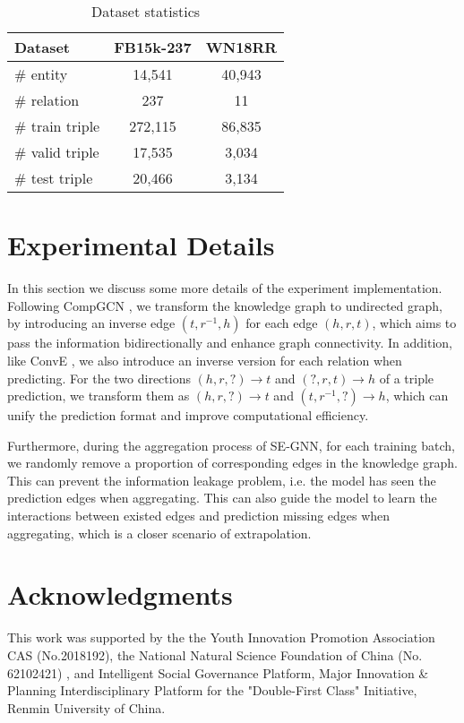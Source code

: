 \documentclass[letterpaper]{article} \usepackage{aaai22}  \usepackage{times}  \usepackage{helvet}  \usepackage{courier}  \usepackage[hyphens]{url}  \usepackage{graphicx} \urlstyle{rm} \def\UrlFont{\rm}  \usepackage{natbib}  \usepackage{caption} \DeclareCaptionStyle{ruled}{labelfont=normalfont,labelsep=colon,strut=off} \frenchspacing  \setlength{\pdfpagewidth}{8.5in}  \setlength{\pdfpageheight}{11in}  \usepackage{algorithm}
\begin{document}
\begin{table}[h]
    \centering
    \begin{tabular}{lcc}
      \toprule
      \textbf{Dataset} & \textbf{FB15k-237} & \textbf{WN18RR}\\
      \hline\hline
      \# entity          & 14,541     & 40,943  \\
      \# relation        & 237        & 11      \\ 
      \# train triple    & 272,115    & 86,835  \\
      \# valid triple    & 17,535     & 3,034   \\ 
      \# test triple     & 20,466     & 3,134   \\
      \bottomrule
    \end{tabular}
    \caption{Dataset statistics}
    \label{tab: dataset}
\end{table}

\section{Experimental Details}
\label{ap: experiment config}
In this section we discuss some more details of the experiment implementation. Following CompGCN \cite{ICLR_2020_Vashishth_CompGCN}, we transform the knowledge graph to undirected graph, by introducing an inverse edge $(t, r^{-1}, h)$ for each edge $(h, r, t)$, which aims to pass the information bidirectionally and enhance graph connectivity. In addition, like ConvE \cite{AAAI_2018_Dettmers_ConvE_WN18RR}, we also introduce an inverse version for each relation when predicting. For the two directions $(h, r, ?) \rightarrow t$ and $(?, r, t) \rightarrow h$ of a triple prediction, we transform them as $(h, r, ?) \rightarrow t$ and  $(t, r^{-1}, ?) \rightarrow h$, which can unify the prediction format and improve computational efficiency.

Furthermore, during the aggregation process of SE-GNN, for each training batch, we randomly remove a proportion of corresponding edges in the knowledge graph. This can prevent the information leakage problem, i.e. the model has seen the prediction edges when aggregating. This can also guide the model to learn the interactions between existed edges and prediction missing edges when aggregating, which is a closer scenario of extrapolation.

\clearpage

\section*{Acknowledgments}
This work was supported by the the Youth Innovation Promotion Association CAS (No.2018192), the National Natural Science Foundation of China (No. 62102421) , and Intelligent Social Governance Platform, Major Innovation \& Planning Interdisciplinary Platform for the "Double-First Class" Initiative, Renmin University of China. 


\end{document}
